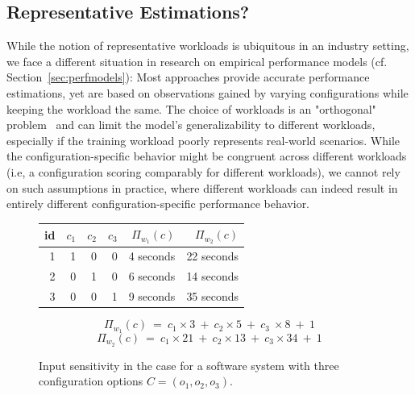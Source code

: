 {\subsection{Representative Estimations?}\label{sec:generalizability}
While the notion of representative workloads is ubiquitous in an industry setting, we face a different situation in research on empirical performance models (cf. Section~\ref{sec:perfmodels}): Most approaches provide accurate performance estimations, yet are based on observations gained by varying configurations while keeping the workload the same. The choice of workloads is an "orthogonal" problem~\cite{han_confprof_2021} and can limit the model's generalizability to different workloads, especially if the training workload poorly represents real-world scenarios. While the configuration-specific behavior might be congruent across different workloads (i.e, a configuration scoring comparably for different workloads), we cannot rely on such assumptions in practice, where different workloads can indeed result in entirely different configuration-specific performance behavior.

\begin{figure}
	\centering\footnotesize
	\begin{tabular}{r|rrr|rr}
		\toprule
		id & $c_1$ & $c_2$ &  $c_3$ & $\Pi_{w_1}(c)$ & $\Pi_{w_2}(c)$\\
		\midrule
		1  & \cellcolor{black!15}1 & \cellcolor{black!4}0 & \cellcolor{black!4}0 & \cellcolor{green!10}4 seconds & 22 seconds \\
		2  & \cellcolor{black!4}0 & \cellcolor{black!15}1 & \cellcolor{black!4}0 & 6 seconds & \cellcolor{green!10}14 seconds \\
		3  & \cellcolor{black!4}0 & \cellcolor{black!4}0 & \cellcolor{black!15}1 & 9 seconds & 35 seconds \\
		\bottomrule
	\end{tabular}
	
	$$ \Pi_{w_1}(c) ~=~ c_1 \times 3 ~+~ c_2 \times 5 ~+~ c_3 ~\times 8 ~+~ 1$$
	$$ \Pi_{w_2}(c) ~=~ c_1 \times 21 ~+~ c_2 \times 13 ~+~ c_3 \times 34 ~+~ 1$$
	\caption{Input sensitivity in the case for a software system with three configuration options $C = (o_1, o_2, o_3)$.}
	\label{fig:sensitivity_example}
\end{figure}


}
